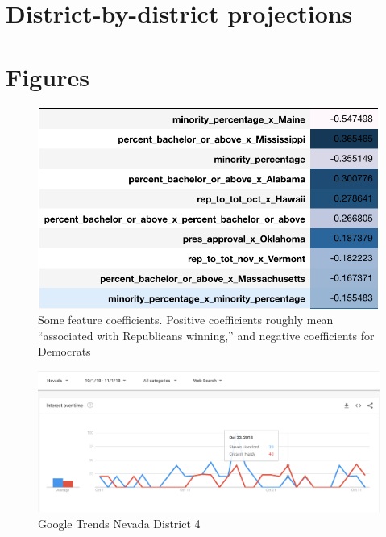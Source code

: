 \documentclass[12pt, letterpaper]{article}
\begin{document}




\newpage
\appendix

\section{District-by-district projections}
\label{sec:district_results}





\section{Figures}
\label{sec:figures}

\begin{figure}[tbh]
  \centering
  \includegraphics[scale=0.8]{feature_coeff}
  \caption{Some feature coefficients. Positive coefficients roughly mean ``associated with Republicans winning,'' and negative coefficients for Democrats}
  \label{fig:feature}
\end{figure}

 \begin{figure}[tbh]
  \centering
  \includegraphics[scale=0.4]{google_trends_ex}
  \caption{Google Trends Nevada District 4}
  \label{fig:trends}
\end{figure}
\end{document}
